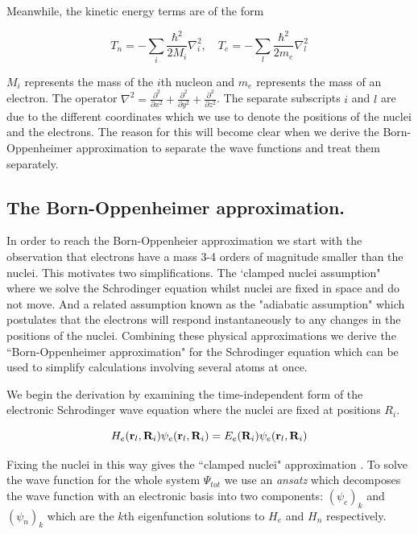 Meanwhile, the kinetic energy terms are of the form 

\begin {equation}
T_n = - \sum_i \frac{\hbar^2}{2M_i} \nabla_i ^2,\quad  T_e = - \sum_l \frac{\hbar^2}{2m_e} \nabla_l ^2
\end {equation}

$M_i$ represents the mass of the $i$th nucleon and $m_e$ represents the mass of an electron. The operator $\nabla^2 = \frac{\partial^2}{\partial x^2} + \frac{\partial^2 }{\partial y^2} + \frac{\partial^2}{\partial z^2} $. The separate subscripts $i$ and $l$ are due to the different coordinates which we use to denote the positions of the nuclei and the electrons. The reason for this will become clear when we derive the Born-Oppenheimer approximation to separate the wave functions and treat them separately.

\subsection{The Born-Oppenheimer approximation.}
In order to reach the Born-Oppenheier approximation we start with the observation that electrons have a mass 3-4 orders of magnitude smaller than the nuclei. This motivates two simplifications. The `clamped nuclei assumption" where we solve the Schrodinger equation whilst nuclei are fixed in space and do not move. And a related assumption known as the "adiabatic assumption" which postulates that the electrons will respond instantaneously to any changes in the positions of the nuclei. Combining these physical approximations we derive the ``Born-Oppenheimer approximation" for the Schrodinger equation which can be used to simplify calculations involving several atoms at once. 

We begin the derivation by examining the time-independent form of the electronic Schrodinger wave equation where the nuclei are fixed at positions $R_i$. 

\begin{equation}
	H_e(\bold{r}_l, \bold{R}_i)  \psi_e (\bold{r}_l,\bold{R}_i)  = E_e(\bold{R}_i) \psi_e (\bold{r}_l,\bold{R}_i) 
\end{equation}

Fixing the nuclei in this way gives the ``clamped nuclei" approximation \cite{sherrill}. To solve the wave function for the whole system $\Psi_{tot}$ we use an \textit{ansatz} which decomposes the wave function with an electronic basis into two components: $({\psi_e})_k$ and $({\psi_n})_k$ which are the $k$th eigenfunction solutions to $H_e$ and $H_n$ respectively.

